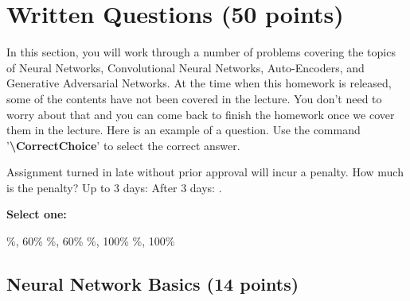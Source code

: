 \section{Written Questions (50 points)}
\begin{notebox}
In this section, you will work through a number of problems covering the topics of Neural Networks, Convolutional Neural Networks, Auto-Encoders, and Generative Adversarial Networks. At the time when this homework is released, some of the contents have not been covered in the lecture. You don't need to worry about that and you can come back to finish the homework once we cover them in the lecture.
Here is an example of a question. Use the command '\textbf{\textbackslash CorrectChoice}' to select the correct answer. 

\begin{questions}
    \question[0] Assignment turned in late without prior approval will incur a penalty. How much is the penalty? Up to 3 days: \underline{\hspace{0.5cm}} After 3 days: \underline{\hspace{0.5cm}}. 
    
    \textbf{Select one:}
    \begin{checkboxes}
        \%, 60\%
        \%, 60\%
        \%, 100\%
        \%, 100\%
    \end{checkboxes}
\end{questions}
\end{notebox}


\subsection{Neural Network Basics (14 points)}

